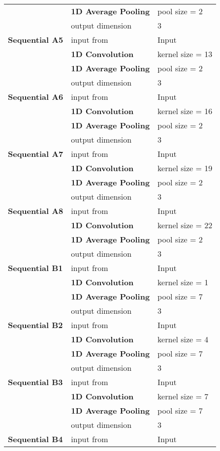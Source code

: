 \begin{appendices}
\begin{tabularx}{\textwidth}[!h]{X X X}
	& \textbf{1D Average Pooling} & pool size = 2\\
	& output dimension & 3\\
	[8pt]
	\textbf{Sequential A5} & input from & Input\\
	& \textbf{1D Convolution} & kernel size = 13\\
	& \textbf{1D Average Pooling} & pool size = 2\\
	& output dimension & 3\\
	[8pt]
	\textbf{Sequential A6} & input from & Input\\
	& \textbf{1D Convolution} & kernel size = 16\\
	& \textbf{1D Average Pooling} & pool size = 2\\
	& output dimension & 3\\
	[8pt]
	\textbf{Sequential A7} & input from & Input\\
	& \textbf{1D Convolution} & kernel size = 19\\
	& \textbf{1D Average Pooling} & pool size = 2\\
	& output dimension & 3\\
	[8pt]
	\textbf{Sequential A8} & input from & Input\\
	& \textbf{1D Convolution} & kernel size = 22\\
	& \textbf{1D Average Pooling} & pool size = 2\\
	& output dimension & 3\\
	[8pt]
	\textbf{Sequential B1} & input from & Input\\
	& \textbf{1D Convolution} & kernel size = 1\\
	& \textbf{1D Average Pooling} & pool size = 7\\
	& output dimension & 3\\
	[8pt]
	\textbf{Sequential B2} & input from & Input\\
	& \textbf{1D Convolution} & kernel size = 4\\
	& \textbf{1D Average Pooling} & pool size = 7\\
	& output dimension & 3\\
	[8pt]
	\textbf{Sequential B3} & input from & Input\\
	& \textbf{1D Convolution} & kernel size = 7\\
	& \textbf{1D Average Pooling} & pool size = 7\\
	& output dimension & 3\\
	[8pt]
	\textbf{Sequential B4} & input from & Input\\

\end{tabularx}
\end{appendices}
